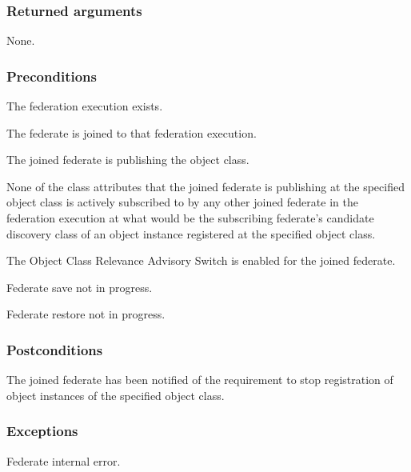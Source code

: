 \clearpage

\begin{compactstdpage}
    \subsubsection{Returned arguments}
    \begin{stdalphalist}
        \item None.
    \end{stdalphalist}

    \subsubsection{Preconditions}
    \begin{stdalphalist}
        \item The federation execution exists.
        \item The federate is joined to that federation execution.
        \item The joined federate is publishing the object class.
        \item None of the class attributes that the joined federate is publishing at the specified object class is actively subscribed to by any other joined federate in the federation execution at what would be the subscribing federate's candidate discovery class of an object instance registered at the specified object class.
        \item The Object Class Relevance Advisory Switch is enabled for the joined federate.
        \item Federate save not in progress.
        \item Federate restore not in progress.
    \end{stdalphalist}

    \subsubsection{Postconditions}
    \begin{stdalphalist}
        \item The joined federate has been notified of the requirement to stop registration of object instances of the specified object class.
    \end{stdalphalist}

    \subsubsection{Exceptions}
    \begin{stdalphalist}
        \item Federate internal error.
    \end{stdalphalist}


\end{compactstdpage}
